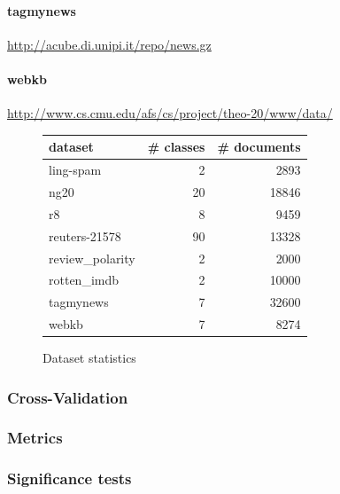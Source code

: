 \paragraph{tagmynews}
\url{http://acube.di.unipi.it/repo/news.gz}

\paragraph{webkb}
\url{http://www.cs.cmu.edu/afs/cs/project/theo-20/www/data/}

\begin{figure}[ht]
\centering
\begin{tabular}{lrr}
dataset &  \# classes &  \# documents \\
\midrule
ling-spam       &  2 &  2893 \\
ng20            &  20 &  18846 \\
r8              &  8 &  9459 \\
reuters-21578   &  90 &  13328 \\
review\_polarity &  2 &  2000 \\
rotten\_imdb     &  2 &  10000 \\
tagmynews       &  7 &  32600 \\
webkb           &  7 &  8274 \\

\end{tabular}

\caption{Dataset statistics}
\end{figure}



\subsubsection{Cross-Validation}
\subsubsection{Metrics}
\subsubsection{Significance tests}

